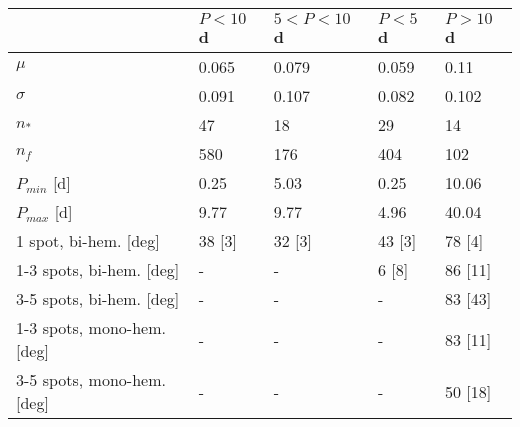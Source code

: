 \begin{tabular}{lllll}
\hline
{} & $P<10\,$d & $5<P<10\,$d & $P<5\,$d & $P>10\,$d \\
\hline
$\mu$                      &     0.065 &       0.079 &    0.059 &      0.11 \\
$\sigma$                   &     0.091 &       0.107 &    0.082 &     0.102 \\
$n_{*}$                    &        47 &          18 &       29 &        14 \\
$n_{f}$                    &       580 &         176 &      404 &       102 \\
$P_{min}$ [d]              &      0.25 &        5.03 &     0.25 &     10.06 \\
$P_{max}$ [d]              &      9.77 &        9.77 &     4.96 &     40.04 \\
1 spot, bi-hem. [deg]     &    38 [3] &      32 [3] &   43 [3] &    78 [4] \\
1-3 spots, bi-hem. [deg]   &         - &           - &    6 [8] &   86 [11] \\
3-5 spots, bi-hem. [deg]   &         - &           - &        - &   83 [43] \\
1-3 spots, mono-hem. [deg] &         - &           - &        - &   83 [11] \\
3-5 spots, mono-hem. [deg] &         - &           - &        - &   50 [18] \\
\hline
\end{tabular}
